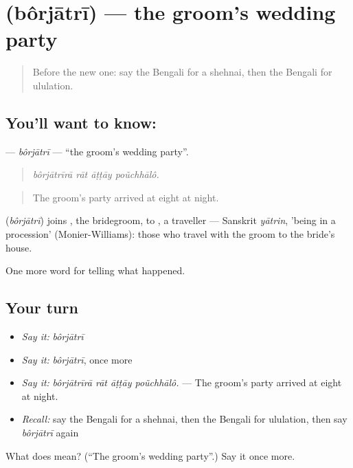 \section[\texorpdfstring{\bn{বরযাত্রী} (bôrjātrī)}{বরযাত্রী (bôrjātrī)}]{ (bôrjātrī) — the groom's wedding party}

\label{lesson:BN-C312-borjatri}



\begin{quote}
Before the new one: say the Bengali for a shehnai, then the Bengali for ululation.
\end{quote}

\subsection*{You'll want to know: }
\textbf{} — \emph{bôrjātrī} — \textquotedblleft{}the groom's wedding party\textquotedblright{}.

\begin{quote}
   
\end{quote}

\begin{quote}
\emph{bôrjātrīrā rāt āṭṭāy poũchhālô.}
\end{quote}

\begin{quote}
The groom's party arrived at eight at night.
\end{quote}

\begin{cousinweb}
\textbf{} (\emph{bôrjātrī}) joins \textbf{}, the bridegroom, to \textbf{}, a traveller — Sanskrit \emph{yātrin}, 'being in a procession' (Monier-Williams): those who travel with the groom to the bride's house.
\end{cousinweb}

\begin{grammarlens}[title={What you've built}]
One more word for telling what happened.
\end{grammarlens}

\subsection*{Your turn}
\begin{itemize}
\raggedright
  \item \emph{Say it:} \emph{bôrjātrī}
  \item \emph{Say it:} \emph{bôrjātrī}, once more
  \item \emph{Say it:} \emph{bôrjātrīrā rāt āṭṭāy poũchhālô.} — The groom's party arrived at eight at night.
  \item \emph{Recall:} say the Bengali for a shehnai, then the Bengali for ululation, then say \emph{bôrjātrī} again
\end{itemize}

\begin{tcolorbox}[breakable,colback=teal!4,colframe=teal!35!black,title={Before you move on}]
What does  mean? (\textquotedblleft{}The groom's wedding party\textquotedblright{}.) Say it once more.
\end{tcolorbox}
